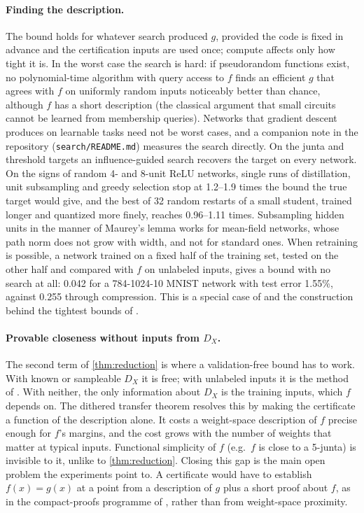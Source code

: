 \paragraph{Finding the description.} The bound holds for whatever search produced $g$, provided the code is fixed in advance and the certification inputs are used once; compute affects only how tight it is. In the worst case the search is hard: if pseudorandom functions exist, no polynomial-time algorithm with query access to $f$ finds an efficient $g$ that agrees with $f$ on uniformly random inputs noticeably better than chance, although $f$ has a short description (the classical argument that small circuits cannot be learned from membership queries). Networks that gradient descent produces on learnable tasks need not be worst cases, and a companion note in the repository (\texttt{search/README.md}) measures the search directly. On the junta and threshold targets an influence-guided search recovers the target on every network. On the signs of random 4- and 8-unit ReLU networks, single runs of distillation, unit subsampling and greedy selection stop at 1.2--1.9 times the bound the true target would give, and the best of 32 random restarts of a small student, trained longer and quantized more finely, reaches 0.96--1.11 times. Subsampling hidden units in the manner of Maurey's lemma works for mean-field networks, whose path norm does not grow with width, and not for standard ones. When retraining is possible, a network trained on a fixed half of the training set, tested on the other half and compared with $f$ on unlabeled inputs, gives a bound with no search at all: 0.042 for a 784-1024-10 MNIST network with test error 1.55\%, against 0.255 through compression. This is a special case of \citet{kaariainen2005generalization} and the construction behind the tightest bounds of \citet{bazinet2026bound}.

\paragraph{Provable closeness without inputs from $D_X$.} The second term of \cref{thm:reduction} is where a validation-free bound has to work. With known or sampleable $D_X$ it is free; with unlabeled inputs it is the method of \citet{bazinet2026bound}. With neither, the only information about $D_X$ is the training inputs, which $f$ depends on. The dithered transfer theorem resolves this by making the certificate a function of the description alone. It costs a weight-space description of $f$ precise enough for $f$'s margins, and the cost grows with the number of weights that matter at typical inputs. Functional simplicity of $f$ (e.g.\ $f$ is close to a 5-junta) is invisible to it, unlike to \cref{thm:reduction}. Closing this gap is the main open problem the experiments point to. A certificate would have to establish $f(x)=g(x)$ at a point from a description of $g$ plus a short proof about $f$, as in the compact-proofs programme of \citet{gross2024compact}, rather than from weight-space proximity.


